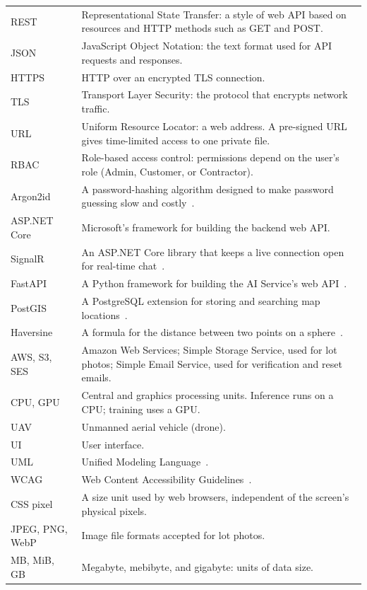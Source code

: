 {\begin{longtable}{@{}p{}p{}@{}}
REST & Representational State Transfer: a style of web API based on resources and HTTP methods such as GET and POST. \\
JSON & JavaScript Object Notation: the text format used for API requests and responses. \\
HTTPS & HTTP over an encrypted TLS connection. \\
TLS & Transport Layer Security: the protocol that encrypts network traffic. \\
URL & Uniform Resource Locator: a web address. A pre-signed URL gives time-limited access to one private file. \\
RBAC & Role-based access control: permissions depend on the user's role (Admin, Customer, or Contractor). \\
Argon2id & A password-hashing algorithm designed to make password guessing slow and costly~\citep{owasppasswordstorage}. \\
ASP.NET Core & Microsoft's framework for building the backend web API. \\
SignalR & An ASP.NET Core library that keeps a live connection open for real-time chat~\citep{microsoftsignalr}. \\
FastAPI & A Python framework for building the AI Service's web API~\citep{fastapidocs}. \\
PostGIS & A PostgreSQL extension for storing and searching map locations~\citep{postgisdocs}. \\
Haversine & A formula for the distance between two points on a sphere~\citep{sinnott1984haversine}. \\
AWS, S3, SES & Amazon Web Services; Simple Storage Service, used for lot photos; Simple Email Service, used for verification and reset emails. \\
CPU, GPU & Central and graphics processing units. Inference runs on a CPU; training uses a GPU. \\
UAV & Unmanned aerial vehicle (drone). \\
UI & User interface. \\
UML & Unified Modeling Language~\citep{omguml251}. \\
WCAG & Web Content Accessibility Guidelines~\citep{wcag22}. \\
CSS pixel & A size unit used by web browsers, independent of the screen's physical pixels. \\
JPEG, PNG, WebP & Image file formats accepted for lot photos. \\
MB, MiB, GB & Megabyte, mebibyte, and gigabyte: units of data size. \\

\end{longtable}}
